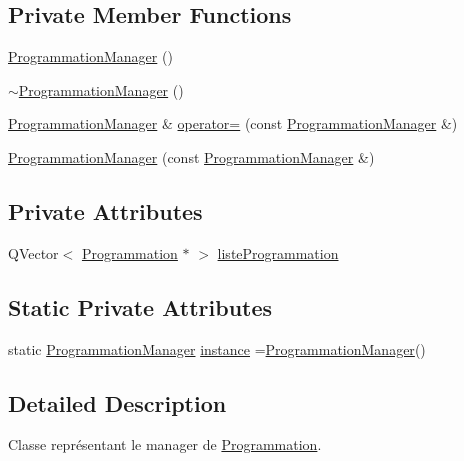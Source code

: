 \subsection*{Private Member Functions}
\begin{DoxyCompactItemize}
\item 
\hyperlink{class_programmation_manager_ac493a099c33e7ea0cf8eb4b6036f0a1a}{Programmation\+Manager} ()
\item 
\hyperlink{class_programmation_manager_a51a54dc0fee78a0b831519f3cde27ff6}{$\sim$\+Programmation\+Manager} ()
\item 
\hyperlink{class_programmation_manager}{Programmation\+Manager} \& \hyperlink{class_programmation_manager_a64a3749fe471a9cb58c598d4308ab994}{operator=} (const \hyperlink{class_programmation_manager}{Programmation\+Manager} \&)
\item 
\hyperlink{class_programmation_manager_a05cc9a749fdd300053ea89e947d03571}{Programmation\+Manager} (const \hyperlink{class_programmation_manager}{Programmation\+Manager} \&)
\end{DoxyCompactItemize}
\subsection*{Private Attributes}
\begin{DoxyCompactItemize}
\item 
Q\+Vector$<$ \hyperlink{class_programmation}{Programmation} $\ast$ $>$ \hyperlink{class_programmation_manager_a23540a1467db12d716d19641d70447b8}{liste\+Programmation}
\end{DoxyCompactItemize}
\subsection*{Static Private Attributes}
\begin{DoxyCompactItemize}
\item 
static \hyperlink{class_programmation_manager}{Programmation\+Manager} \hyperlink{class_programmation_manager_a04ca8715bceaec304a821a6d61b5a94d}{instance} =\hyperlink{class_programmation_manager}{Programmation\+Manager}()
\end{DoxyCompactItemize}


\subsection{Detailed Description}
Classe représentant le manager de \hyperlink{class_programmation}{Programmation}. 

